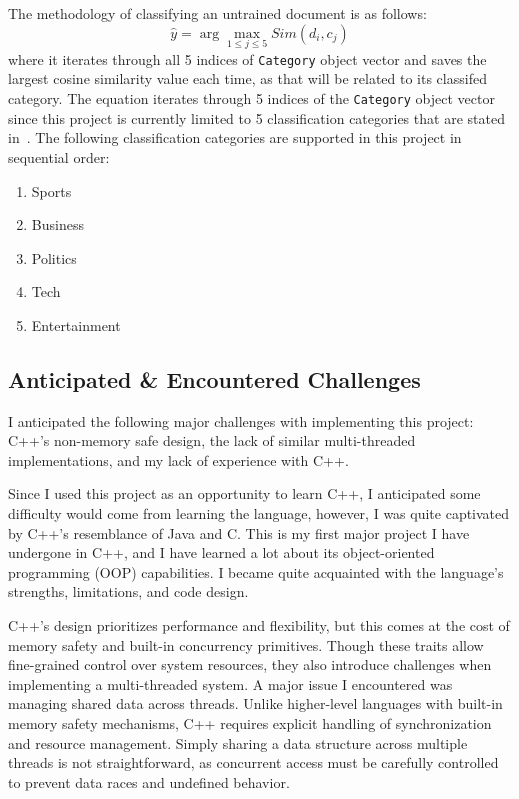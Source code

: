 \documentclass[conference]{IEEEtran}
\newcommand{\code}[1]{\lstinline[basicstyle=\ttfamily]|#1|}
\begin{document}
The methodology of classifying an untrained document is as follows:
\begin{equation}
    \hat{y} = \arg\max_{1 \leq j \leq 5} \textit{Sim}(d_i, c_j)
\end{equation}
where it iterates through all 5 indices of \code{Category} object vector and saves the largest cosine similarity value each time, as that will be related to its classifed category. The equation iterates through 5 indices of the \code{Category} object vector since this project is currently limited to 5 classification categories that are stated in~\cite{b6}. The following classification categories are supported in this project in sequential order:
\begin{enumerate}
    \item Sports
    \item Business
    \item Politics
    \item Tech
    \item Entertainment
\end{enumerate}
    



\subsection{Anticipated \& Encountered Challenges}
I anticipated the following major challenges with implementing this project: C++’s non-memory safe design, the lack of similar multi-threaded implementations, and my lack of experience with C++.

Since I used this project as an opportunity to learn C++, I anticipated some difficulty would come from learning the language, however, I was quite captivated by C++’s resemblance of Java and C. This is my first major project I have undergone in C++, and I have learned a lot about its object-oriented programming (OOP) capabilities. I became quite acquainted with the language’s strengths, limitations, and code design.

C++’s design prioritizes performance and flexibility, but this comes at the cost of memory safety and built-in concurrency primitives. Though these traits allow fine-grained control over system resources, they also introduce challenges when implementing a multi-threaded system. A major issue I encountered was managing shared data across threads. Unlike higher-level languages with built-in memory safety mechanisms, C++ requires explicit handling of synchronization and resource management. Simply sharing a data structure across multiple threads is not straightforward, as concurrent access must be carefully controlled to prevent data races and undefined behavior.
\end{document}
